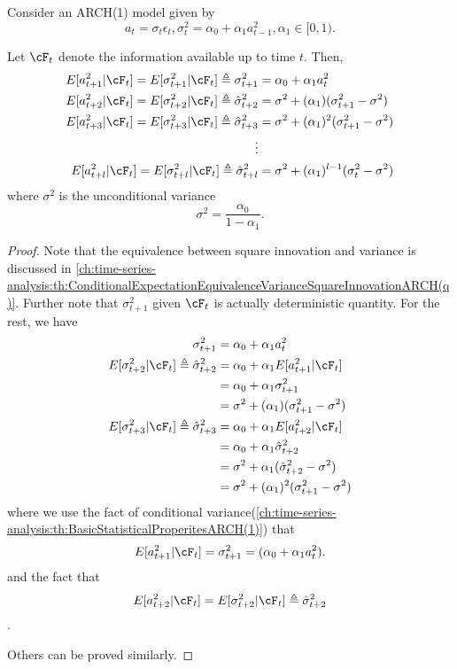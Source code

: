 \begin{theorem}
	Consider an ARCH(1) model given by
	$$a_t = \sigma_t \epsilon_t, \sigma_t^2 = \alpha_0 + \alpha_1a_{t-1}^2,\alpha_1 \in [0,1).$$
	
	Let $\cF_t$ denote the information available up to time $t$. Then,
	\begin{align*}
	E[a_{t+1}^2|\cF_t] = E[\sigma_{t+1}^2|\cF_t] \triangleq 
	\sigma^2_{t+1} &= \alpha_0 + \alpha_1 a_{t}^2 \\ 
	E[a_{t+2}^2|\cF_t] = E[\sigma_{t+2}^2|\cF_t]\triangleq \hat{\sigma}_{t+2}^2 
	&=\sigma^2 + (\alpha_1)(\sigma_{t+1}^2 - \sigma^2)\\
	E[a_{t+3}^2|\cF_t] = E[\sigma_{t+3}^2|\cF_t]\triangleq \hat{\sigma}_{t+3}^2 &= \sigma^2 + (\alpha_1)^2(\sigma_{t+1}^2 - \sigma^2)\\
	\vdots & \\
	E[a_{t+l}^2|\cF_t] = E[\sigma_{t+l}^2|\cF_t]\triangleq\hat{\sigma}_{t+l}^2 &= \sigma^2 + (\alpha_1)^{l-1}(\sigma_t^2 - \sigma^2)
	\end{align*}
	where $\sigma^2$ is the unconditional variance $$\sigma^2 = \frac{\alpha_0}{1 - \alpha_1}.$$	
\end{theorem}
\begin{proof}
Note that the equivalence between square innovation and variance is discussed in \autoref{ch:time-series-analysis:th:ConditionalExpectationEquivalenceVarianceSquareInnovationARCH(q)}. 	
Further note that $\sigma_{t+1}^2$ given $\cF_t$ is actually deterministic quantity. For the rest, we have
\begin{align*}
	\sigma_{t+1}^2 &= \alpha_0 + \alpha_1 a_{t}^2 \\
	E[\sigma_{t+2}^2|\cF_t]\triangleq \hat{\sigma}_{t+2}^2 &= \alpha_0 + \alpha_1 E[a_{t+1}^2|\cF_{t}] \\
	&=\alpha_0 + \alpha_1\sigma_{t+1}^2 \\
	&=\sigma^2 + (\alpha_1)(\sigma_{t+1}^2 - \sigma^2)\\
	E[\sigma_{t+3}^2|\cF_t]\triangleq \hat{\sigma}_{t+3}^2 &= \alpha_0 + \alpha_1 E[a_{t+2}^2|\cF_{t}] \\
	&=\alpha_0 + \alpha_1 \hat{\sigma}_{t+2}^2\\
	&=\sigma^2 + \alpha_1(\hat{\sigma}^2_{t+2}-\sigma^2)\\
	&=\sigma^2 + (\alpha_1)^2(\sigma_{t+1}^2 - \sigma^2)
	\end{align*}
where we use the fact of conditional variance(\autoref{ch:time-series-analysis:th:BasicStatisticalProperitesARCH(1)}) that
$$E[a_{t+1}^2|\cF_{t}] = \sigma_{t+1}^2 = (\alpha_0 + \alpha_1 a_{t}^2).$$
and the fact that $$E[a_{t+2}^2|\cF_t] = E[\sigma_{t+2}^2|\cF_t]\triangleq \hat{\sigma}_{t+2}^2$$.

	
Others can be proved similarly.	
\end{proof}

